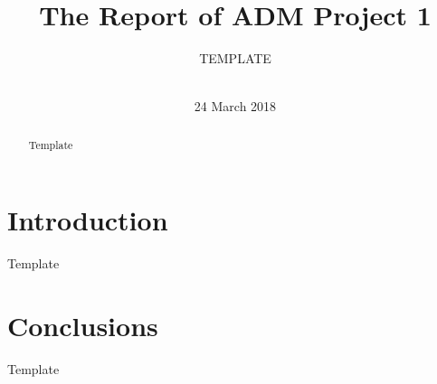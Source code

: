 \documentclass{sig-alternate-05-2015}
\begin{document}
\title{The Report of ADM Project 1} 
\author{ 
\alignauthor
       TEMPLATE\\
       \\
 } 
\date{24 March 2018}
 
\maketitle

\begin{abstract}
Template
\end{abstract}
\section{Introduction} 
Template
\section{Conclusions} 
Template

  
\end{document}
